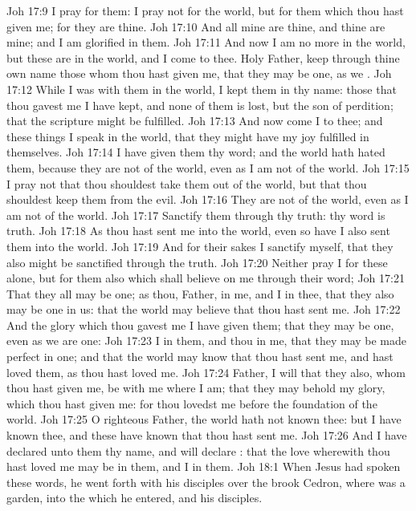 \vs Joh 17:9 I pray for them: I pray not for the world, but for them which thou hast given me; for they are thine.
\vs Joh 17:10 And all mine are thine, and thine are mine; and I am glorified in them.
\vs Joh 17:11 And now I am no more in the world, but these are in the world, and I come to thee. Holy Father, keep through thine own name those whom thou hast given me, that they may be one, as we .
\vs Joh 17:12 While I was with them in the world, I kept them in thy name: those that thou gavest me I have kept, and none of them is lost, but the son of perdition; that the scripture might be fulfilled.
\vs Joh 17:13 And now come I to thee; and these things I speak in the world, that they might have my joy fulfilled in themselves.
\vs Joh 17:14 I have given them thy word; and the world hath hated them, because they are not of the world, even as I am not of the world.
\vs Joh 17:15 I pray not that thou shouldest take them out of the world, but that thou shouldest keep them from the evil.
\vs Joh 17:16 They are not of the world, even as I am not of the world.
\vs Joh 17:17 Sanctify them through thy truth: thy word is truth.
\vs Joh 17:18 As thou hast sent me into the world, even so have I also sent them into the world.
\vs Joh 17:19 And for their sakes I sanctify myself, that they also might be sanctified through the truth.
\vs Joh 17:20 Neither pray I for these alone, but for them also which shall believe on me through their word;
\vs Joh 17:21 That they all may be one; as thou, Father,  in me, and I in thee, that they also may be one in us: that the world may believe that thou hast sent me.
\vs Joh 17:22 And the glory which thou gavest me I have given them; that they may be one, even as we are one:
\vs Joh 17:23 I in them, and thou in me, that they may be made perfect in one; and that the world may know that thou hast sent me, and hast loved them, as thou hast loved me.
\vs Joh 17:24 Father, I will that they also, whom thou hast given me, be with me where I am; that they may behold my glory, which thou hast given me: for thou lovedst me before the foundation of the world.
\vs Joh 17:25 O righteous Father, the world hath not known thee: but I have known thee, and these have known that thou hast sent me.
\vs Joh 17:26 And I have declared unto them thy name, and will declare : that the love wherewith thou hast loved me may be in them, and I in them.
\vs Joh 18:1 When Jesus had spoken these words, he went forth with his disciples over the brook Cedron, where was a garden, into the which he entered, and his disciples.
